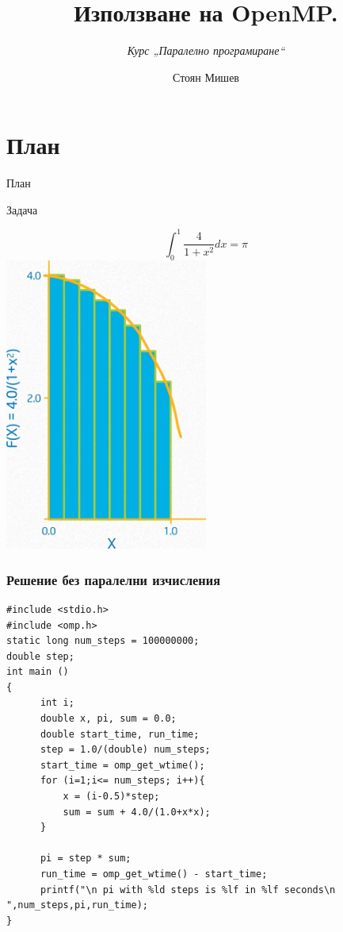 \documentclass{beamer}
\title{Използване на OpenMP.}
\subtitle{\textit{Курс „Паралелно програмиране“}}
\author{\newline \newline Стоян Мишев}
\date{} %
\begin{document}
\lstset{language=Python}
{ 
\frame{\titlepage}}


\section*{План}\begin{frame}{План}\tableofcontents\end{frame}


\begin{frame}[plain]{Задача}

  \begin{equation}
    \int_0^1 \frac{4}{1+x^2} dx = \pi  \nonumber
  \end{equation} \pause
\centering
  \includegraphics[width=0.5\textwidth]{integral-graph}

\end{frame}

\begin{frame}
  \frametitle{Решение без паралелни изчисления}
  \scriptsize
\lstset{language=C++}
    \begin{lstlisting}
#include <stdio.h>
#include <omp.h>
static long num_steps = 100000000;
double step;
int main ()
{
	  int i;
	  double x, pi, sum = 0.0;
	  double start_time, run_time;
	  step = 1.0/(double) num_steps;
	  start_time = omp_get_wtime();
	  for (i=1;i<= num_steps; i++){
		  x = (i-0.5)*step;
		  sum = sum + 4.0/(1.0+x*x);
	  }

	  pi = step * sum;
	  run_time = omp_get_wtime() - start_time;
	  printf("\n pi with %ld steps is %lf in %lf seconds\n ",num_steps,pi,run_time);
}	  
    \end{lstlisting}
\end{frame}
\end{document}
